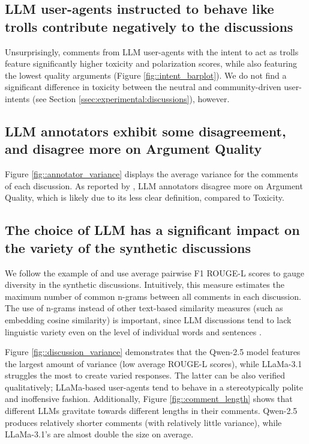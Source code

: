 \subsection{LLM user-agents instructed to behave like trolls contribute negatively to the discussions}

Unsurprisingly, comments from \ac{LLM} user-agents with the intent to act as trolls feature significantly higher toxicity and polarization scores, while also featuring the lowest quality arguments (Figure \ref{fig::intent_barplot}). We do not find a significant difference in toxicity between the neutral and community-driven user-intents (see Section \ref{ssec:experimental:discussions}), however.


\subsection{LLM annotators exhibit some disagreement, and disagree more on Argument Quality}

Figure \ref{fig::annotator_variance} displays the average variance for the comments of each discussion. As reported by \textcite{argyle2023}, \ac{LLM} annotators disagree more on Argument Quality, which is likely due to its less clear definition, compared to Toxicity.


\subsection{The choice of LLM has a significant impact on the variety of the synthetic discussions}

We follow the example of \textcite{ulmer2024bootstrappingllmbasedtaskorienteddialogue} and use average pairwise F1 ROUGE-L scores \cite{lin-2004-rouge} to gauge diversity in the synthetic discussions. Intuitively, this measure estimates the maximum number of common n-grams between all comments in each discussion. The use of n-grams instead of other text-based similarity measures (such as embedding cosine similarity) is important, since \ac{LLM} discussions tend to lack linguistic variety even on the level of individual words and sentences \cite{ulmer2024bootstrappingllmbasedtaskorienteddialogue}. 

Figure \ref{fig::discussion_variance} demonstrates that the Qwen-2.5 model features the largest amount of variance (low average ROUGE-L scores), while LLaMa-3.1 struggles the most to create varied responses. The latter can be also verified qualitatively; LLaMa-based user-agents tend to behave in a stereotypically polite and inoffensive fashion. Additionally, Figure \ref{fig::comment_length} shows that different \acp{LLM} gravitate towards different lengths in their comments. Qwen-2.5 produces relatively shorter comments (with relatively little variance), while LLaMa-3.1's are almost double the size on average.


